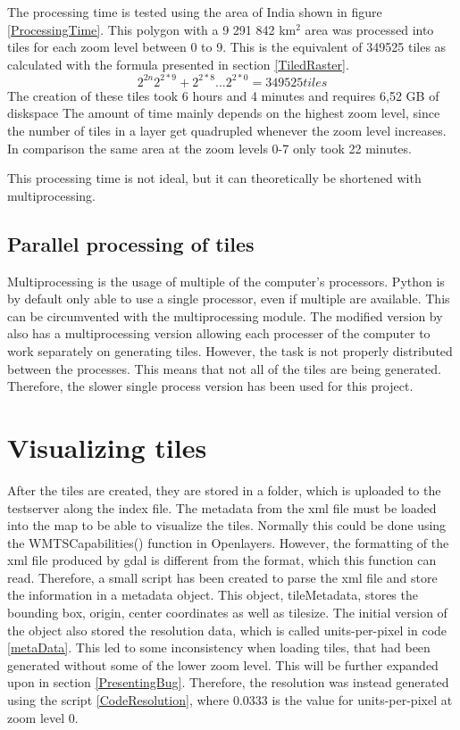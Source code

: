 The processing time is tested using the area of India shown in figure \ref{ProcessingTime}. This polygon with a 9 291 842 km$^2$ area was processed into tiles for each zoom level between 0 to 9. This is the equivalent of 349525 tiles as calculated with the formula presented in section \ref{TiledRaster}. 
\begin{equation}
2^{2n}
2^{2*9}+2^{2*8} .. . 2^{2*0} = 349525 tiles
\end{equation}
The creation of these tiles took 6 hours and 4 minutes and requires 6,52 GB of diskspace The amount of time mainly depends on the highest zoom level, since the number of tiles in a layer get quadrupled whenever the zoom level increases. In comparison the same area at the zoom levels 0-7 only took 22 minutes.

This processing time is not ideal, but it can theoretically be shortened with multiprocessing.
\subsection{Parallel processing of tiles}\label{ParallelTiles}
Multiprocessing is the usage of multiple of the computer’s processors. Python is by default only able to use a single processor, even if multiple are available.  This can be circumvented with the multiprocessing module.
\citep{Multiprocessing}
The modified version by \citet{gdalLeaflet} also has a multiprocessing version allowing each processer of the computer to work separately on generating tiles. However, the task is not properly distributed between the processes. This means that not all of the tiles are being generated. 
\citep{NoMulti}
Therefore, the slower single process version has been used for this project.


\section{Visualizing tiles}\label{ShowTiles}
After the tiles are created, they are stored in a folder, which is uploaded to the testserver along the index file. 
The metadata from the xml file must be loaded into the map to be able to visualize the tiles. Normally this could be done using the WMTSCapabilities() function in Openlayers.
\citep{WmtsOl}
However, the formatting of the xml file produced by gdal is different from the format, which this function can read. Therefore, a small script has been created to parse the xml file and store the information in a metadata object. This object, tileMetadata, stores the bounding box, origin, center coordinates as well as tilesize. The initial version of the object also stored the resolution data, which is called units-per-pixel in code \ref{metaData}. This led to some inconsistency when loading tiles, that had been generated without some of the lower zoom level. This will be further expanded upon in section \ref{PresentingBug}. Therefore, the resolution was instead generated using the script \ref{CodeResolution}, where 0.0333 is the value for units-per-pixel at zoom level 0. 

